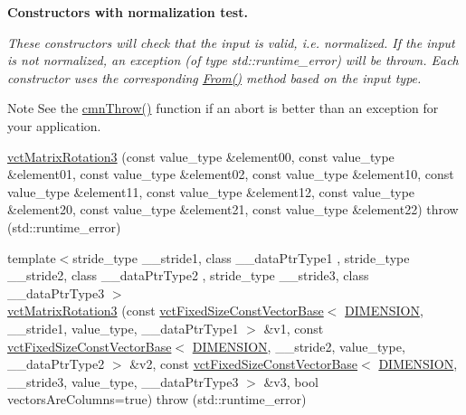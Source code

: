 \begin{Indent}{\bf Constructors with normalization test.}\par
{\em These constructors will check that the input is valid, i.\+e. normalized. If the input is not normalized, an exception (of type {\ttfamily std\+::runtime\+\_\+error}) will be thrown. Each constructor uses the corresponding \hyperlink{classvct_matrix_rotation3_base_afb96603eae3080e013984aa908408f73}{From()} method based on the input type.

\begin{DoxyNote}{Note}
See the \hyperlink{_minimal_cmn_8h_ad50e82cf9c9dbd0e6443c13e0d1a6f1a}{cmn\+Throw()} function if an {\ttfamily abort} is better than an exception for your application. 
\end{DoxyNote}
}\begin{DoxyCompactItemize}
\item 
\hyperlink{classvct_matrix_rotation3_ae2a44894c83fefe6d98ab78ac56b1ef6}{vct\+Matrix\+Rotation3} (const value\+\_\+type \&element00, const value\+\_\+type \&element01, const value\+\_\+type \&element02, const value\+\_\+type \&element10, const value\+\_\+type \&element11, const value\+\_\+type \&element12, const value\+\_\+type \&element20, const value\+\_\+type \&element21, const value\+\_\+type \&element22)  throw (std\+::runtime\+\_\+error)
\item 
{\footnotesize template$<$stride\+\_\+type \+\_\+\+\_\+stride1, class \+\_\+\+\_\+data\+Ptr\+Type1 , stride\+\_\+type \+\_\+\+\_\+stride2, class \+\_\+\+\_\+data\+Ptr\+Type2 , stride\+\_\+type \+\_\+\+\_\+stride3, class \+\_\+\+\_\+data\+Ptr\+Type3 $>$ }\\\hyperlink{classvct_matrix_rotation3_af830f0e91dda43d4197ead0e4627ee8e}{vct\+Matrix\+Rotation3} (const \hyperlink{classvct_fixed_size_const_vector_base}{vct\+Fixed\+Size\+Const\+Vector\+Base}$<$ \hyperlink{group__cisst_vector_ggaa21ad8fcafb1ab9d70efcec9bda6eab2af25ebbcafe4db62f894c21db0608cd65}{D\+I\+M\+E\+N\+S\+I\+O\+N}, \+\_\+\+\_\+stride1, value\+\_\+type, \+\_\+\+\_\+data\+Ptr\+Type1 $>$ \&v1, const \hyperlink{classvct_fixed_size_const_vector_base}{vct\+Fixed\+Size\+Const\+Vector\+Base}$<$ \hyperlink{group__cisst_vector_ggaa21ad8fcafb1ab9d70efcec9bda6eab2af25ebbcafe4db62f894c21db0608cd65}{D\+I\+M\+E\+N\+S\+I\+O\+N}, \+\_\+\+\_\+stride2, value\+\_\+type, \+\_\+\+\_\+data\+Ptr\+Type2 $>$ \&v2, const \hyperlink{classvct_fixed_size_const_vector_base}{vct\+Fixed\+Size\+Const\+Vector\+Base}$<$ \hyperlink{group__cisst_vector_ggaa21ad8fcafb1ab9d70efcec9bda6eab2af25ebbcafe4db62f894c21db0608cd65}{D\+I\+M\+E\+N\+S\+I\+O\+N}, \+\_\+\+\_\+stride3, value\+\_\+type, \+\_\+\+\_\+data\+Ptr\+Type3 $>$ \&v3, bool vectors\+Are\+Columns=true)  throw (std\+::runtime\+\_\+error)

\end{DoxyCompactItemize}
\end{Indent}
